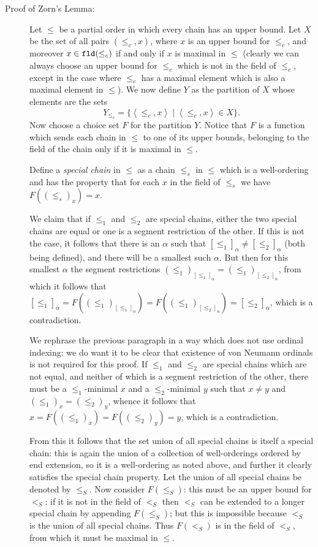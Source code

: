 \documentclass[12pt]{book}
\begin{document}
\begin{description}
\item[Proof of Zorn's Lemma:]  Let $\leq$ be a partial order in which every chain has an upper bound.  Let $X$ be the set of all pairs
$(\leq_c,x)$, where $x$ is an upper bound for $\leq_c$, and moreover $x \in {\tt fld}(\leq_c)$ if and only if $x$ is maximal in $\leq$ (clearly we can always choose an upper bound for $\leq_c$ which is not in the field of $\leq_c$, except in the case where $\leq_c$ has a maximal element which is also a maximal element in $\leq$).   We now define $Y$ as the partition of $X$ whose elements are the sets $$Y_{\leq_c} = \{\left<\leq_c,x\right>\mid \left<\leq_c,x\right> \in X\}.$$  Now choose a choice set $F$ for the partition $Y$.  Notice that $F$ is a function which sends each chain in 
$\leq$ to one of its upper bounds, belonging to the field of the chain only if it is maximal in $\leq$.

Define a {\em special chain\/} in $\leq$ as a chain $\leq_s$ in $\leq$ which is a well-ordering and has the property that for each $x$ in the field of $\leq_s$ we have \newline $F((\leq_s)_x)=x$.

We claim that if $\leq_1$ and $\leq_2$ are special chains, either the two special chains are equal or one is a segment restriction of the other.  If this is not the case, it follows that there is an $\alpha$ such that $[\leq_1]_{\alpha} \neq [\leq_2]_{\alpha}$ (both being defined), and there will be a smallest such $\alpha$.  But then for this smallest $\alpha$ the segment restrictions $(\leq_1)_{[\leq_1]_{\alpha}}=(\leq_1)_{[\leq_2]_{\alpha}}$, from which it follows that $[\leq_1]_{\alpha}=F((\leq_1)_{[\leq_1]_{\alpha}})=F((\leq_1)_{[\leq_2]_{\alpha}})=[\leq_2]_{\alpha}$, which is a contradiction.

We rephrase the previous paragraph in a way which does not use ordinal indexing:  we do want it to be clear that existence of von Neumann ordinals is not required for this proof.
If $\leq_1$ and $\leq_2$ are special chains which are not equal, and neither of which is a segment restriction of the other, there must be a $\leq_1$-minimal $x$ and a $\leq_2$-minimal
$y$ such that $x \neq y$ and $(\leq_1)_x = (\leq_2)_y$, whence it follows that $x = F((\leq_1)_x) =  F((\leq_2)_y) = y$, which is a contradiction.

From this it follows that the set union of all special chains is itself a special chain:  this is again the union of a collection of well-orderings ordered by end extension, so it is a well-ordering as noted above, and further it clearly satisfies the special chain property.  Let the union of all special chains be denoted by $\leq_S$.  Now consider $F(\leq_S)$: this must be an upper bound for $<_S$:  if it is not in the field of $<_S$ then $<_S$ can be extended to a longer special chain by appending $F(\leq_S)$;  but this is impossible because $<_S$ is the union of all special chains.  Thus $F(<_S)$ is in the field of $<_S$, from which it must be maximal in $\leq$.

\end{description}
\end{document}
